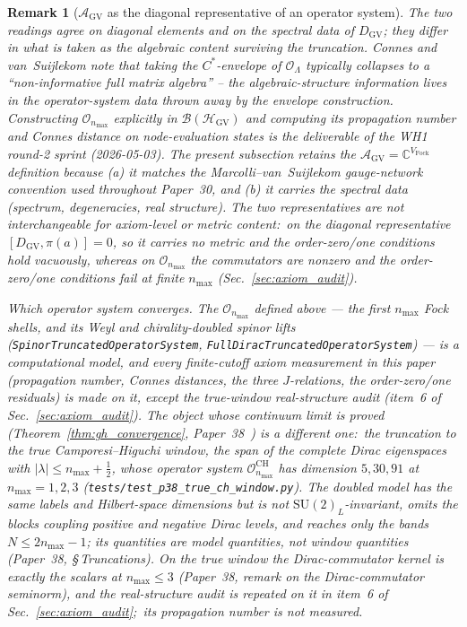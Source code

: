 \documentclass[11pt]{article}
\newtheorem{remark}{Remark}
\begin{document}
\begin{remark}[$\mathcal{A}_{\mathrm{GV}}$ as the diagonal representative of an operator system]
The two readings agree on diagonal elements and on the spectral
data of $D_{\mathrm{GV}}$; they differ in what is taken as the
algebraic content surviving the truncation.  Connes and
van~Suijlekom note that taking the $C^*$-envelope of $\mathcal{O}_\Lambda$
typically collapses to a ``non-informative full matrix algebra'' --
the algebraic-structure information lives in the operator-system
data thrown away by the envelope construction.  Constructing
$\mathcal{O}_{n_{\max}}$ explicitly in $\mathcal{B}(\mathcal{H}_{\mathrm{GV}})$
and computing its propagation number and Connes distance on
node-evaluation states is the deliverable of the WH1 round-2 sprint
(2026-05-03).
The present subsection retains the
$\mathcal{A}_{\mathrm{GV}} = \mathbb{C}^{V_{\mathrm{Fock}}}$ definition
because (a) it matches the Marcolli--van~Suijlekom gauge-network
convention used throughout Paper~30, and (b) it carries the
spectral data (spectrum, degeneracies, real structure).  The two
representatives are \emph{not} interchangeable for axiom-level or
metric content:\ on the diagonal representative $[D_{\mathrm{GV}},
\pi(a)] = 0$, so it carries no metric and the order-zero/one conditions
hold vacuously, whereas on $\mathcal{O}_{n_{\max}}$ the commutators are
nonzero and the order-zero/one conditions fail at finite $n_{\max}$
(Sec.~\ref{sec:axiom_audit}).

\emph{Which operator system converges.}  The
$\mathcal{O}_{n_{\max}}$ defined above --- the first $n_{\max}$ Fock
shells, and its Weyl and chirality-doubled spinor lifts
(\texttt{SpinorTruncatedOperatorSystem},
\texttt{FullDiracTruncatedOperatorSystem}) --- is a
\emph{computational model}, and every finite-cutoff axiom measurement
in this paper (propagation number, Connes distances, the three
$J$-relations, the order-zero/one residuals) is made on it, except the
true-window real-structure audit (item~6 of
Sec.~\ref{sec:axiom_audit}).  The object
whose continuum limit is proved (Theorem~\ref{thm:gh_convergence},
Paper~38~\cite{loutey_paper38}) is a different one:\ the truncation to
the \emph{true} Camporesi--Higuchi window, the span of the complete
Dirac eigenspaces with $|\lambda| \le n_{\max} + \tfrac12$, whose
operator system $\mathcal{O}^{\mathrm{CH}}_{n_{\max}}$ has dimension
$5, 30, 91$ at $n_{\max} = 1, 2, 3$ (\texttt{tests/test\_p38\_true\_ch\_window.py}).
The doubled model has the same labels and Hilbert-space dimensions but
is not $\mathrm{SU}(2)_L$-invariant, omits the blocks coupling positive
and negative Dirac levels, and reaches only the bands $N \le 2n_{\max}-1$;
its quantities are model quantities, not window quantities (Paper~38,
\S\,Truncations).  On the true window the Dirac-commutator kernel is
exactly the scalars at $n_{\max} \le 3$ (Paper~38,
remark on the Dirac-commutator seminorm), and the real-structure audit is repeated
on it in item~6 of Sec.~\ref{sec:axiom_audit};\ its propagation number
is not measured.
\end{remark}
\end{document}
